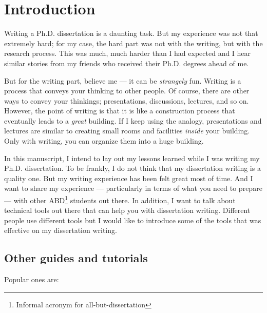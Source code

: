 \documentclass[11pt]{article}
\begin{document}
\section{Introduction}

Writing a Ph.D. dissertation is a daunting task. But my experience was not
that extremely hard; for my case, the hard part was not with the writing, but
with the research process. This was much, much harder than I had expected 
and I hear similar stories from my friends who received their Ph.D. degrees ahead
of me.

But for the writing part, believe me --- it can be \emph{strangely} fun.
Writing is a process that conveys your thinking to other people.  Of course,
there are other ways to convey your thinkings; presentations, discussions,
lectures, and so on.  However, the point of writing is that it is like a
construction process that eventually leads to a \emph{great} building.  If I
keep using the analogy, presentations and lectures are similar to
creating small rooms and facilities \emph{inside} your building. Only with
writing, you can organize them into a huge building.

In this manuscript, I intend to lay out my lessons learned while I was writing
my Ph.D. dissertation. To be frankly, I do not think that my dissertation
writing is a quality one. But my writing experience has been felt great most
of time. And I want to share my experience --- particularly in terms of what
you need to prepare --- with other ABD\footnote{Informal acronym for
all-but-dissertation} students out there. In addition, I want to talk about
technical tools out there that can help you with dissertation writing.
Different people use different tools but I would like to introduce some of the
tools that was effective on my dissertation writing. 

\subsection{Other guides and tutorials}
Popular ones are:
\end{document}
